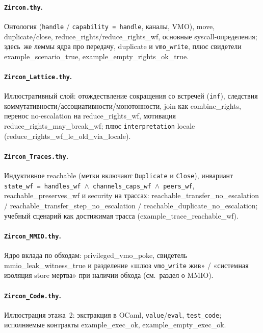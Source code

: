 \documentclass[11pt,a4paper]{article}
\newcommand{\isabel}[1]{{\isabelleit #1}}
\newcommand{\lemmaname}[1]{\isabel{#1}}
\begin{document}
\paragraph{\texttt{Zircon.thy}.}
Онтология (\texttt{handle} / \texttt{capability = handle}, каналы, VMO),
move, duplicate/close,
\lemmaname{reduce\_rights}/\lemmaname{reduce\_rights\_wf},
основные syscall-определения; здесь~же леммы ядра про передачу,
duplicate и \texttt{vmo\_write}, плюс свидетели
\lemmaname{example\_scenario\_true},
\lemmaname{example\_empty\_rights\_ok\_true}.

\paragraph{\texttt{Zircon\_Lattice.thy}.}
Иллюстративный слой: отождествление сокращения со встречей
(\texttt{inf}), следствия коммутативности/ассоциативности/монотонности,
join как \lemmaname{combine\_rights}, перенос no-escalation на
\lemmaname{reduce\_rights\_wf}, мотивация
\lemmaname{reduce\_rights\_may\_break\_wf}; плюс
\texttt{interpretation} locale
(\lemmaname{reduce\_rights\_wf\_le\_old\_via\_locale}).

\paragraph{\texttt{Zircon\_Traces.thy}.}
Индуктивное \lemmaname{reachable} (метки включают \texttt{Duplicate}
и \texttt{Close}), инвариант
\texttt{state\_wf = handles\_wf $\wedge$ channels\_caps\_wf $\wedge$ peers\_wf},
\lemmaname{reachable\_preserves\_wf} и security на трассах:
\lemmaname{reachable\_transfer\_no\_escalation} /
\lemmaname{reachable\_transfer\_step\_no\_escalation} /
\lemmaname{reachable\_duplicate\_no\_escalation};
учебный сценарий как достижимая трасса
(\lemmaname{example\_trace\_reachable\_wf}).

\paragraph{\texttt{Zircon\_MMIO.thy}.}
Ядро вклада по обходам: \lemmaname{privileged\_vmo\_poke}, свидетель
\lemmaname{mmio\_leak\_witness\_true} и разделение «шлюз
\texttt{vmo\_write} жив» / «системная изоляция store мертва» при наличии
обхода (см.~раздел о MMIO).

\paragraph{\texttt{Zircon\_Code.thy}.}
Иллюстрация этажа~2: экстракция в OCaml, \texttt{value}/\texttt{eval},
\texttt{test\_code}; исполняемые контракты
\lemmaname{example\_exec\_ok}, \lemmaname{example\_empty\_exec\_ok}.
\end{document}
